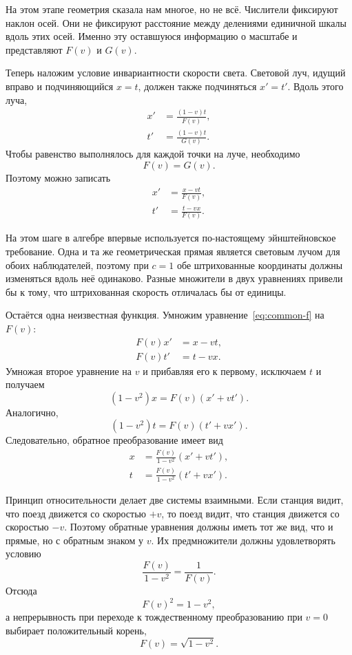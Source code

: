 На этом этапе геометрия сказала нам многое, но не всё. Числители фиксируют наклон осей. Они не фиксируют расстояние между делениями единичной шкалы вдоль этих осей. Именно эту оставшуюся информацию о масштабе и представляют \(F(v)\) и \(G(v)\).

Теперь наложим условие инвариантности скорости света. Световой луч, идущий вправо и подчиняющийся \(x=t\), должен также подчиняться \(x'=t'\). Вдоль этого луча,
\begin{align}
x'&=\frac{(1-v)t}{F(v)},\\
t'&=\frac{(1-v)t}{G(v)}.
\end{align}
Чтобы равенство выполнялось для каждой точки на луче, необходимо
\begin{equation}
F(v)=G(v).
\end{equation}
Поэтому можно записать
\begin{align}
x'&=\frac{x-vt}{F(v)},\\
t'&=\frac{t-vx}{F(v)}.
\label{eq:common-f}
\end{align}

На этом шаге в алгебре впервые используется по-настоящему эйнштейновское требование. Одна и та же геометрическая прямая является световым лучом для обоих наблюдателей, поэтому при \(c=1\) обе штрихованные координаты должны изменяться вдоль неё одинаково. Разные множители в двух уравнениях привели бы к тому, что штрихованная скорость отличалась бы от единицы.

Остаётся одна неизвестная функция. Умножим уравнение~\eqref{eq:common-f} на \(F(v)\):
\begin{align}
F(v)x'&=x-vt,\\
F(v)t'&=t-vx.
\end{align}
Умножая второе уравнение на \(v\) и прибавляя его к первому, исключаем \(t\) и получаем
\begin{equation}
(1-v^2)x=F(v)(x'+vt').
\end{equation}
Аналогично,
\begin{equation}
(1-v^2)t=F(v)(t'+vx').
\end{equation}
Следовательно, обратное преобразование имеет вид
\begin{align}
x&=\frac{F(v)}{1-v^2}(x'+vt'),\\
t&=\frac{F(v)}{1-v^2}(t'+vx').
\end{align}

Принцип относительности делает две системы взаимными. Если станция видит, что поезд движется со скоростью \(+v\), то поезд видит, что станция движется со скоростью \(-v\). Поэтому обратные уравнения должны иметь тот же вид, что и прямые, но с обратным знаком у \(v\). Их предмножители должны удовлетворять условию
\begin{equation}
\frac{F(v)}{1-v^2}=\frac{1}{F(v)}.
\end{equation}
Отсюда
\begin{equation}
F(v)^2=1-v^2,
\end{equation}
а непрерывность при переходе к тождественному преобразованию при \(v=0\) выбирает положительный корень,
\begin{equation}
F(v)=\sqrt{1-v^2}.
\end{equation}

